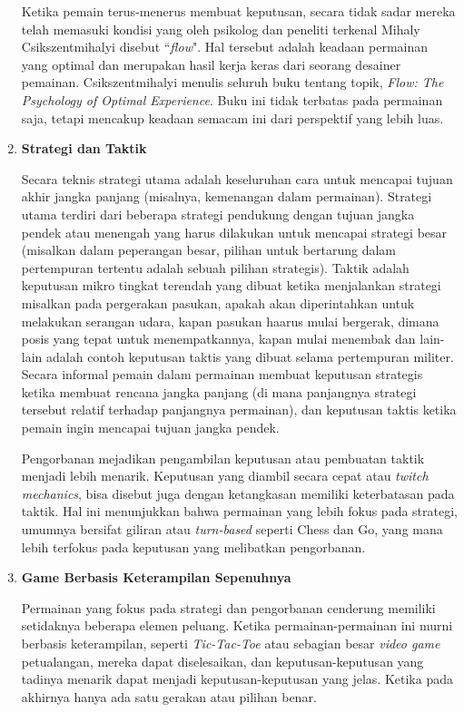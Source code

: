 \begin{subs}
\begin{enumerate}[label=\textbf{\alph*).}]
		Ketika pemain terus-menerus membuat keputusan, secara tidak sadar mereka telah memasuki kondisi yang oleh psikolog dan peneliti terkenal Mihaly Csikszentmihalyi disebut ``\textit{flow}". Hal tersebut adalah keadaan permainan yang optimal dan merupakan hasil kerja keras dari seorang desainer pemainan. Csikszentmihalyi menulis seluruh buku tentang topik, \textit{Flow: The Psychology of Optimal Experience}. Buku ini tidak terbatas pada permainan saja, tetapi mencakup keadaan semacam ini dari perspektif yang lebih luas.
		\vspace{1ex}
		
		\item \textbf{Strategi dan Taktik}
		
		Secara teknis strategi utama adalah keseluruhan cara untuk mencapai tujuan akhir jangka panjang (misalnya, kemenangan dalam permainan). Strategi utama terdiri dari beberapa strategi pendukung dengan tujuan jangka pendek atau menengah yang harus dilakukan untuk mencapai strategi besar (misalkan dalam peperangan besar, pilihan untuk bertarung dalam pertempuran tertentu adalah sebuah pilihan strategis). Taktik adalah keputusan mikro tingkat terendah yang dibuat ketika menjalankan strategi misalkan pada pergerakan pasukan, apakah akan diperintahkan untuk melakukan serangan udara, kapan pasukan haarus mulai bergerak, dimana posis yang tepat untuk menempatkannya, kapan mulai menembak dan lain-lain adalah contoh keputusan taktis yang dibuat selama pertempuran militer. Secara informal pemain dalam permainan membuat keputusan strategis ketika membuat rencana jangka panjang (di mana panjangnya strategi tersebut relatif terhadap panjangnya permainan), dan keputusan taktis ketika pemain ingin mencapai tujuan jangka pendek.
		\vspace{1ex}
		
		Pengorbanan mejadikan pengambilan keputusan atau pembuatan taktik menjadi lebih menarik. Keputusan yang diambil secara cepat atau \textit{twitch mechanics}, bisa disebut juga dengan ketangkasan memiliki keterbatasan pada taktik. Hal ini menunjukkan bahwa permainan yang lebih fokus pada strategi, umumnya bersifat giliran atau \textit{turn-based} seperti Chess dan Go, yang mana lebih terfokus pada keputusan yang melibatkan pengorbanan.
		\vspace{1ex}
		
		\item \textbf{Game Berbasis Keterampilan Sepenuhnya}
		
		Permainan yang fokus pada strategi dan pengorbanan cenderung memiliki setidaknya beberapa elemen peluang. Ketika permainan-permainan ini murni berbasis keterampilan, seperti \textit{Tic-Tac-Toe} atau sebagian besar \textit{video game} petualangan, mereka dapat diselesaikan, dan keputusan-keputusan yang tadinya menarik dapat menjadi keputusan-keputusan yang jelas. Ketika pada akhirnya hanya ada satu gerakan atau pilihan benar.
		\vspace{1ex}
		

\end{enumerate}
\end{subs}
